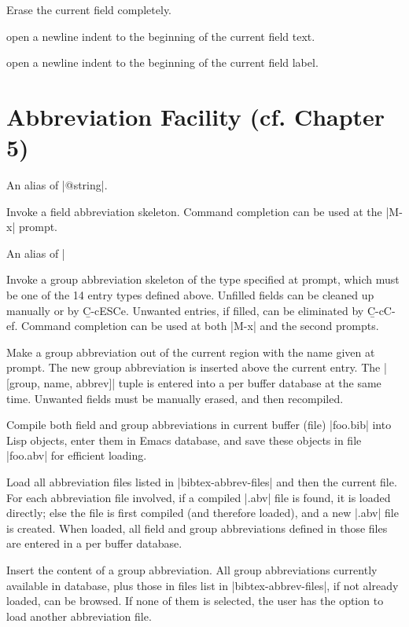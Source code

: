 Erase the current field completely.

open a newline indent to the beginning of the current field text.

open a newline indent to the beginning of the current field label.


\section{Abbreviation Facility (cf. Chapter 5)}

An alias of |@string|.

Invoke a field abbreviation skeleton.
Command completion can be used at the |M-x| prompt.

An alias of |%

Invoke a group abbreviation skeleton of the type specified at prompt,
which must be one of the 14 entry types defined above.
Unfilled fields can be cleaned up manually or by {\b C-c{\s}ESC{\s}e}.
Unwanted entries, if filled, can be eliminated by {\b C-c{\s}C-e{\s}f}.
Command completion can be used at both |M-x| and the second prompts.

Make a group abbreviation out of the current region with the
name given at prompt.  The new group abbreviation is inserted above the
current entry.  The |[group, name, abbrev]| tuple is 
entered into a per buffer database at the same time.
Unwanted fields must be manually erased, and then recompiled.

Compile both field and group abbreviations in current buffer (file) |foo.bib|
into Lisp objects, enter them in Emacs database, and save these objects
in file |foo.abv| for efficient loading.

Load all abbreviation files listed in |bibtex-abbrev-files|
and then the current file.  For each abbreviation file involved,
if a compiled |.abv| file is found, it is loaded directly;
else the file is first compiled (and therefore loaded), and a
new |.abv| file is created.  When loaded, all field and group abbreviations
defined in those files are entered in a per buffer database.

Insert the content of a group abbreviation.
All group abbreviations currently available in database,
plus those in files list in |bibtex-abbrev-files|, if not already loaded,
can be browsed.  If none of them is selected, the user has the option to load
another abbreviation file.


